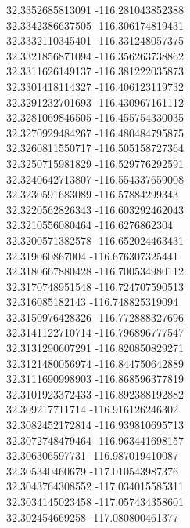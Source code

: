 {32.3352685813091	-116.281043852388\\
32.3342386637505	-116.306174819431\\
32.3332110345401	-116.331248057375\\
32.3321856871094	-116.356263738862\\
32.3311626149137	-116.381222035873\\
32.3301418114327	-116.406123119732\\
32.3291232701693	-116.430967161112\\
32.3281069846505	-116.455754330035\\
32.3270929484267	-116.480484795875\\
32.3260811550717	-116.505158727364\\
32.3250715981829	-116.529776292591\\
32.3240642713807	-116.554337659008\\
32.3230591683089	-116.57884299343\\
32.3220562826343	-116.603292462043\\
32.3210556080464	-116.6276862304\\
32.3200571382578	-116.652024463431\\
32.319060867004	-116.676307325441\\
32.3180667880428	-116.700534980112\\
32.3170748951548	-116.724707590513\\
32.316085182143	-116.748825319094\\
32.3150976428326	-116.772888327696\\
32.3141122710714	-116.796896777547\\
32.3131290607291	-116.820850829271\\
32.3121480056974	-116.844750642889\\
32.3111690998903	-116.868596377819\\
32.3101923372433	-116.892388192882\\
32.309217711714	-116.916126246302\\
32.3082452172814	-116.939810695713\\
32.3072748479464	-116.963441698157\\
32.306306597731	-116.987019410087\\
32.305340460679	-117.010543987376\\
32.3043764308552	-117.034015585311\\
32.3034145023458	-117.057434358601\\
32.302454669258	-117.080800461377\\
}
